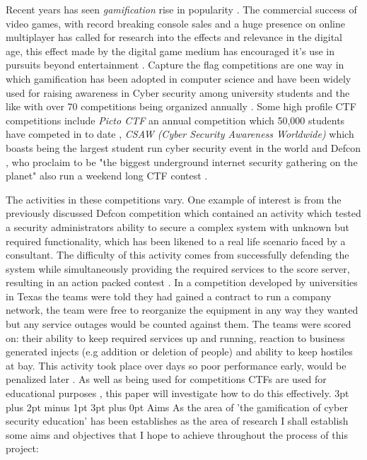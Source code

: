 \documentclass[12pt,a4paper]{article}
\makeatletter
\renewcommand\subsection{\@startsection {subsection}{1}{2mm} %
                               {3pt plus 2pt minus 1pt} %
                               {3pt plus 0pt} %
                               {\normalfont\bfseries}}
\makeatother
\begin{document}
Recent years has seen \emph{gamification} rise in popularity \cite{deterding2011game}. The commercial success of video games, with record breaking console sales and a huge presence on online multiplayer has called for research into the effects and relevance in the digital age, this effect made by the digital game medium has encouraged it's use in pursuits beyond entertainment \cite{seaborn2015gamification}. Capture the flag competitions are one way in which gamification has been adopted in computer science and have been widely used for raising awareness in Cyber security among university students and the like \cite{ford2017capture} with over 70 competitions being organized annually \cite{katsantonis2017conceptual1}. Some high profile CTF competitions include \emph{Picto CTF} \cite{pictoctf} an annual competition which 50,000 students have competed in to date \cite{pictoctfstat}, \emph{CSAW (Cyber Security Awareness Worldwide)} which boasts being the largest student run cyber security event in the world \cite{csaw} and Defcon \cite{defcon}, who proclaim to be "the biggest underground internet security gathering on the planet" also run a weekend long CTF contest \cite{cowan2003defcon}.  


The activities in these competitions vary. One example of interest is from the previously discussed Defcon competition which contained an activity which tested a security administrators ability to secure a complex system with unknown but required functionality, which has been likened to a real life scenario faced by a consultant. The difficulty of this activity comes from successfully defending the system while simultaneously providing the required services to the score server, resulting in an action packed contest \cite{cowan2003defcon}. In a competition developed by universities in Texas the teams were told they had gained a contract to run a company network, the team were free to reorganize the equipment in any way they wanted but any service outages would be counted against them. The teams were scored on: their ability to keep  required services up and running, reaction to business generated injects (e.g addition or deletion of people) and ability to keep hostiles at bay. This activity took place over days so poor performance early, would be penalized later \cite{conklin2006cyber}. As well as being used for competitions CTFs are used for educational purposes \cite{noor2018usability}, this paper will investigate how to do this effectively.
\subsection{Aims} 
As the area of 'the gamification of cyber security education' has been establishes as the area of research I shall establish some aims and objectives that I hope to achieve throughout the process of this project:  
\end{document}
